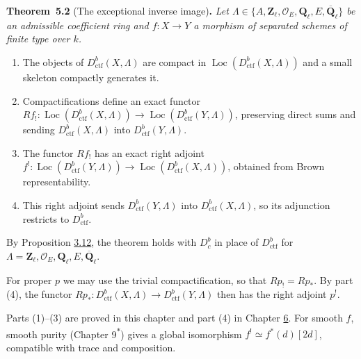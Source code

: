 \documentclass[11pt]{article}
\newenvironment{bpstatement}[2]{\par\addvspace{0.6\baselineskip}\noindent\textbf{#1}#2\textbf{.}\enspace\ignorespaces}
  {\par\addvspace{0.4\baselineskip}}
\newenvironment{bpstatementit}[2]{\begin{bpstatement}{#1}{#2}\itshape\ignorespaces}{\end{bpstatement}}
\newcommand{\bpout}[1]{#1\textsuperscript{\hyperlink{bp-outside}{\ensuremath{\ast}}}}
\providecommand{\Dbc}{}\renewcommand{\Dbc}{D^b_c}
\providecommand{\Loc}{}\renewcommand{\Loc}{\operatorname{Loc}}
\begin{document}
\label{bp413}%
\begin{bpstatementit}{Theorem~5.2}{ (The exceptional inverse image)}
Let \(\Lambda\in\{A,\mathbf Z_\ell,\mathcal O_E,\mathbf Q_\ell,E,\overline{\mathbf Q}_\ell\}\) be an admissible coefficient ring and \(f:X\to Y\) a morphism of separated schemes of finite type over \(k\).

\begin{enumerate}
\item The objects of \(D^b_{\mathrm{ctf}}(X,\Lambda)\) are compact in \(\Loc(D^b_{\mathrm{ctf}}(X,\Lambda))\) and a small skeleton compactly generates it.
\item Compactifications define an exact functor \(Rf_!:\Loc(D^b_{\mathrm{ctf}}(X,\Lambda))\to\Loc(D^b_{\mathrm{ctf}}(Y,\Lambda))\), preserving direct sums and sending \(D^b_{\mathrm{ctf}}(X,\Lambda)\) into \(D^b_{\mathrm{ctf}}(Y,\Lambda)\).
\item The functor \(Rf_!\) has an exact right adjoint \(f^!:\Loc(D^b_{\mathrm{ctf}}(Y,\Lambda))\to\Loc(D^b_{\mathrm{ctf}}(X,\Lambda))\), obtained from Brown representability.
\item This right adjoint sends \(D^b_{\mathrm{ctf}}(Y,\Lambda)\) into \(D^b_{\mathrm{ctf}}(X,\Lambda)\), so its adjunction restricts to \(D^b_{\mathrm{ctf}}\).
\end{enumerate}
\end{bpstatementit}

\label{bp414}%
By Proposition \hyperref[bp232]{3.12}, the theorem holds with \(\Dbc\) in place of \(D^b_{\mathrm{ctf}}\) for \(\Lambda=\mathbf Z_\ell,\mathcal O_E,\mathbf Q_\ell,E,\overline{\mathbf Q}_\ell\).

For proper \(p\) we may use the trivial compactification, so that \(Rp_!=Rp_*\). By part (4), the functor \(Rp_*:D^b_{\mathrm{ctf}}(X,\Lambda)\to D^b_{\mathrm{ctf}}(Y,\Lambda)\) then has the right adjoint \(p^!\).

Parts (1)–(3) are proved in this chapter and part (4) in Chapter \hyperref[bp513]{6}. For smooth \(f\), smooth purity (Chapter \bpout{9}) gives a global isomorphism \(f^!\simeq f^*(d)[2d]\), compatible with trace and composition.


\end{document}

